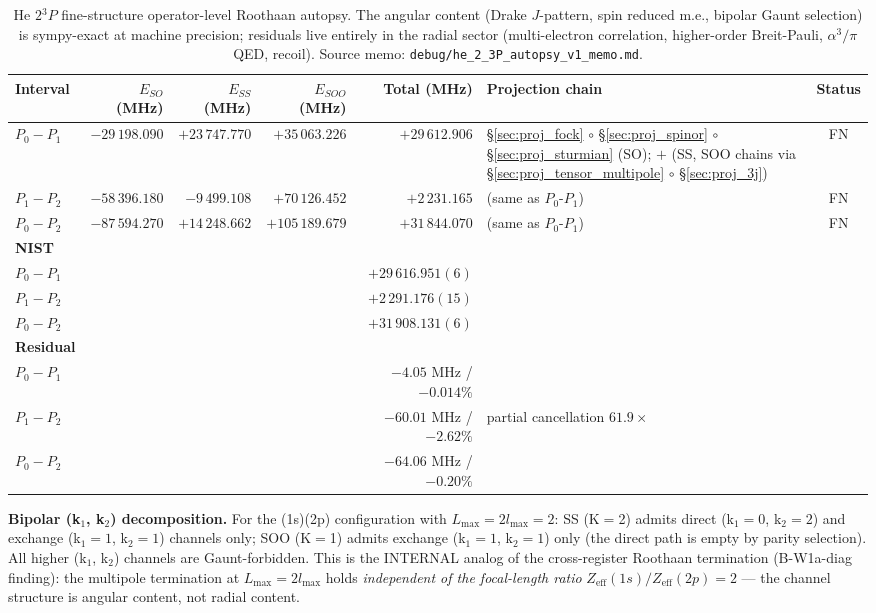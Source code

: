\documentclass[11pt]{article}
\begin{document}
\begin{table}[h]
\centering\small
\begin{tabular}{p{2.6cm} r r r r p{4.5cm} c}
\toprule
Interval & $E_{SO}$ (MHz) & $E_{SS}$ (MHz) & $E_{SOO}$ (MHz) & Total (MHz) & Projection chain & Status \\
\midrule
$P_0 - P_1$ & $-29\,198.090$ & $+23\,747.770$ & $+35\,063.226$ & $+29\,612.906$ &
\S\ref{sec:proj_fock} $\circ$ \S\ref{sec:proj_spinor} $\circ$
\S\ref{sec:proj_sturmian} (SO); $+$ (SS, SOO chains via
\S\ref{sec:proj_tensor_multipole} $\circ$ \S\ref{sec:proj_3j}) & FN \\
$P_1 - P_2$ & $-58\,396.180$ & $-9\,499.108$ & $+70\,126.452$ & $+2\,231.165$ &
(same as $P_0$-$P_1$) & FN \\
$P_0 - P_2$ & $-87\,594.270$ & $+14\,248.662$ & $+105\,189.679$ & $+31\,844.070$ &
(same as $P_0$-$P_1$) & FN \\
\midrule
\textbf{NIST} & & & & & & \\
$P_0 - P_1$ & & & & $+29\,616.951(6)$ & & \\
$P_1 - P_2$ & & & & $+2\,291.176(15)$ & & \\
$P_0 - P_2$ & & & & $+31\,908.131(6)$ & & \\
\midrule
\textbf{Residual} & & & & & & \\
$P_0 - P_1$ & & & & $-4.05$ MHz / $-0.014\%$ & & \\
$P_1 - P_2$ & & & & $-60.01$ MHz / $-2.62\%$ & partial cancellation $61.9\times$ & \\
$P_0 - P_2$ & & & & $-64.06$ MHz / $-0.20\%$ & & \\
\bottomrule
\end{tabular}
\caption{He $2{}^3P$ fine-structure operator-level Roothaan autopsy.
The angular content (Drake $J$-pattern, spin reduced m.e., bipolar
Gaunt selection) is sympy-exact at machine precision; residuals live
entirely in the radial sector (multi-electron correlation, higher-order
Breit-Pauli, $\alpha^3/\pi$ QED, recoil).  Source memo:
\texttt{debug/he\_2\_3P\_autopsy\_v1\_memo.md}.}
\label{tab:autopsy_he_2_3p}
\end{table}

\textbf{Bipolar (k$_1$, k$_2$) decomposition.}
For the (1s)(2p) configuration with $L_\text{max} = 2 l_\text{max} = 2$:
SS (K$=$2) admits direct (k$_1=0$, k$_2=2$) and exchange (k$_1=1$, k$_2=1$)
channels only; SOO (K$=$1) admits exchange (k$_1=1$, k$_2=1$) only (the
direct path is empty by parity selection).  All higher (k$_1$, k$_2$)
channels are Gaunt-forbidden.  This is the INTERNAL analog of the
cross-register Roothaan termination (B-W1a-diag finding): the
multipole termination at $L_\text{max} = 2 l_\text{max}$ holds
\emph{independent of the focal-length ratio} $Z_\text{eff}(1s) /
Z_\text{eff}(2p) = 2$ --- the channel structure is angular content,
not radial content.
\end{document}
